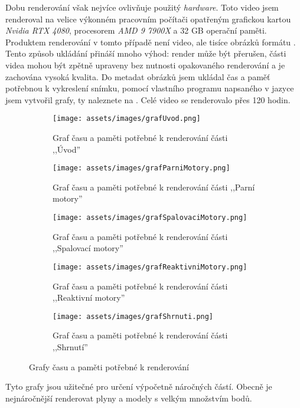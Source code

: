 {Dobu renderování však nejvíce ovlivňuje použitý \textit{hardware}. Toto video jsem renderoval na velice výkonném pracovním počítači opatřeným grafickou kartou \textit{Nvidia RTX 4080}, procesorem \textit{AMD 9 7900X} a 32 GB operační paměti.}\odst
{Produktem renderování v tomto případě není video, ale tisíce obrázků formátu . Tento způsob ukládání přináší mnoho výhod: render může být přerušen, části videa mohou být zpětně upraveny bez nutnosti opakovaného renderování a je zachována vysoká kvalita.}
\newpage
{Do metadat obrázků jsem ukládal čas a paměť potřebnou k vykreslení snímku, pomocí vlastního programu napsaného v jazyce  jsem vytvořil grafy, ty naleznete na . Celé video se renderovalo přes 120 hodin.}
\begin{figure}[H]
    \centering
    \begin{subfigure}{\textwidth}
        \centering
        \texttt{[image: assets/images/grafUvod.png]}
        \caption{Graf času a paměti potřebné k renderování části ,,Úvod'' \jaGraf}\vspace{0.25cm}
    \end{subfigure}
    \begin{subfigure}{\textwidth}
        \texttt{[image: assets/images/grafParniMotory.png]}
        \caption{Graf času a paměti potřebné k renderování části ,,Parní motory'' \jaGraf}\vspace{0.25cm}
    \end{subfigure}
    \begin{subfigure}{\textwidth}
        \texttt{[image: assets/images/grafSpalovaciMotory.png]}
        \caption{Graf času a paměti potřebné k renderování části ,,Spalovací motory'' \jaGraf}\vspace{0.25cm}
    \end{subfigure}
    \begin{subfigure}{\textwidth}
        \texttt{[image: assets/images/grafReaktivniMotory.png]}
        \caption{Graf času a paměti potřebné k renderování části ,,Reaktivní motory'' \jaGraf}\vspace{0.25cm}
    \end{subfigure}
    \begin{subfigure}{\textwidth}
        \texttt{[image: assets/images/grafShrnuti.png]}
        \caption{Graf času a paměti potřebné k renderování části ,,Shrnutí'' \jaGraf}
    \end{subfigure}
    \caption{Grafy času a paměti potřebné k renderování}
    \label{obr:grafRender}
\end{figure}
{Tyto grafy jsou užitečné pro určení výpočetně náročných částí. Obecně je nejnáročnější renderovat plyny a modely s velkým množstvím bodů.}
\newpage
